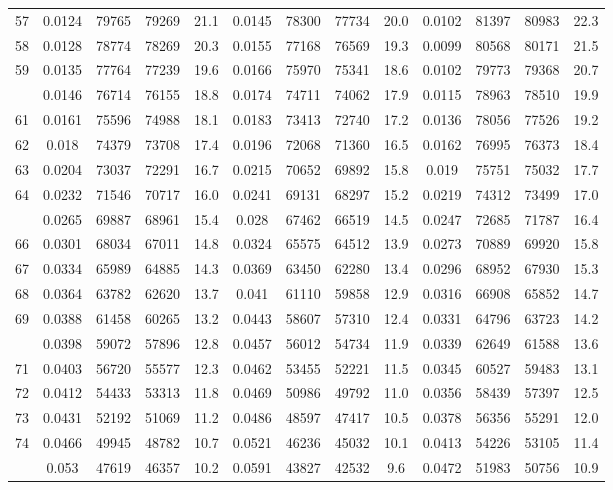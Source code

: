 \documentclass[
  14pt,
]{article}
\begin{document}
\begin{longtable}[t]{lcccccccccccc}
57 & 0.0124 & 79765 & 79269 & 21.1 & 0.0145 & 78300 & 77734 & 20.0 & 0.0102 & 81397 & 80983 & 22.3\\
58 & 0.0128 & 78774 & 78269 & 20.3 & 0.0155 & 77168 & 76569 & 19.3 & 0.0099 & 80568 & 80171 & 21.5\\
59 & 0.0135 & 77764 & 77239 & 19.6 & 0.0166 & 75970 & 75341 & 18.6 & 0.0102 & 79773 & 79368 & 20.7\\
\addlinespace
60 & 0.0146 & 76714 & 76155 & 18.8 & 0.0174 & 74711 & 74062 & 17.9 & 0.0115 & 78963 & 78510 & 19.9\\
61 & 0.0161 & 75596 & 74988 & 18.1 & 0.0183 & 73413 & 72740 & 17.2 & 0.0136 & 78056 & 77526 & 19.2\\
62 & 0.018 & 74379 & 73708 & 17.4 & 0.0196 & 72068 & 71360 & 16.5 & 0.0162 & 76995 & 76373 & 18.4\\
63 & 0.0204 & 73037 & 72291 & 16.7 & 0.0215 & 70652 & 69892 & 15.8 & 0.019 & 75751 & 75032 & 17.7\\
64 & 0.0232 & 71546 & 70717 & 16.0 & 0.0241 & 69131 & 68297 & 15.2 & 0.0219 & 74312 & 73499 & 17.0\\
\addlinespace
65 & 0.0265 & 69887 & 68961 & 15.4 & 0.028 & 67462 & 66519 & 14.5 & 0.0247 & 72685 & 71787 & 16.4\\
66 & 0.0301 & 68034 & 67011 & 14.8 & 0.0324 & 65575 & 64512 & 13.9 & 0.0273 & 70889 & 69920 & 15.8\\
67 & 0.0334 & 65989 & 64885 & 14.3 & 0.0369 & 63450 & 62280 & 13.4 & 0.0296 & 68952 & 67930 & 15.3\\
68 & 0.0364 & 63782 & 62620 & 13.7 & 0.041 & 61110 & 59858 & 12.9 & 0.0316 & 66908 & 65852 & 14.7\\
69 & 0.0388 & 61458 & 60265 & 13.2 & 0.0443 & 58607 & 57310 & 12.4 & 0.0331 & 64796 & 63723 & 14.2\\
\addlinespace
70 & 0.0398 & 59072 & 57896 & 12.8 & 0.0457 & 56012 & 54734 & 11.9 & 0.0339 & 62649 & 61588 & 13.6\\
71 & 0.0403 & 56720 & 55577 & 12.3 & 0.0462 & 53455 & 52221 & 11.5 & 0.0345 & 60527 & 59483 & 13.1\\
72 & 0.0412 & 54433 & 53313 & 11.8 & 0.0469 & 50986 & 49792 & 11.0 & 0.0356 & 58439 & 57397 & 12.5\\
73 & 0.0431 & 52192 & 51069 & 11.2 & 0.0486 & 48597 & 47417 & 10.5 & 0.0378 & 56356 & 55291 & 12.0\\
74 & 0.0466 & 49945 & 48782 & 10.7 & 0.0521 & 46236 & 45032 & 10.1 & 0.0413 & 54226 & 53105 & 11.4\\
\addlinespace
75 & 0.053 & 47619 & 46357 & 10.2 & 0.0591 & 43827 & 42532 & 9.6 & 0.0472 & 51983 & 50756 & 10.9\\

\end{longtable}
\end{document}
